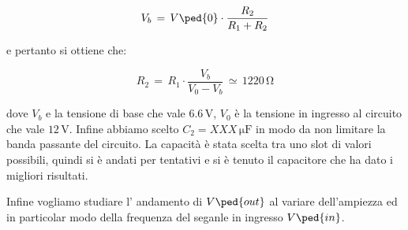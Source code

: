 \begin{equation}
        V_b\,=\,V\ped{0}\cdot\frac{R_2}{R_1+R_2}
\end{equation}

e pertanto si ottiene che:

\begin{equation}
        R_2\,=\,R_1\cdot\frac{V_b}{V_0-V_b} \,\simeq\, 1220\,\si{\ohm}
\end{equation}

dove $V_b$ e la tensione di base che vale $6.6\,\si{\volt}$, $V_0$ è la tensione in ingresso al circuito che vale $12\,\si{\volt}$.
Infine abbiamo scelto $C_2=XXX\,\si{\micro\farad}$ in modo da non limitare la banda passante del circuito. La capacità è stata scelta tra uno slot di valori possibili, quindi si è andati per tentativi e si è tenuto il capacitore che ha dato i migliori risultati.

Infine vogliamo studiare l' andamento di $V\ped{out}$ al variare dell'ampiezza ed in particolar modo della frequenza del seganle in ingresso $V\ped{in}$.
